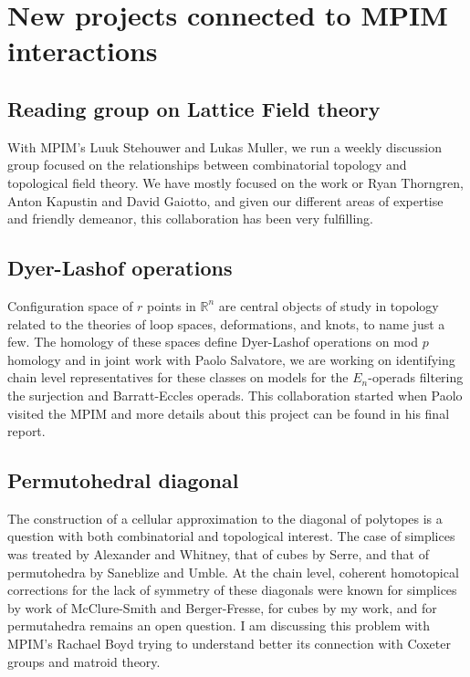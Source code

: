 \documentclass{amsart}
\theoremstyle{definition}
\begin{document}
	\section{New projects connected to MPIM interactions}
	
	\subsection{Reading group on Lattice Field theory}
	With MPIM's Luuk Stehouwer and Lukas Muller, we run a weekly discussion group focused on the relationships between combinatorial topology and topological field theory.
	We have mostly focused on the work or Ryan Thorngren, Anton Kapustin and David Gaiotto, and given our different areas of expertise and friendly demeanor, this collaboration has been very fulfilling.
	
	\subsection{Dyer-Lashof operations}
	Configuration space of $r$ points in $\mathbb R^n$ are central objects of study in topology related to the theories of loop spaces, deformations, and knots, to name just a few.
	The homology of these spaces define Dyer-Lashof operations on mod $p$ homology and in joint work with Paolo Salvatore, we are working on identifying chain level representatives for these classes on models for the $E_n$-operads filtering the surjection and Barratt-Eccles operads.
	This collaboration started when Paolo visited the MPIM and more details about this project can be found in his final report.
	
	\subsection{Permutohedral diagonal}
	The construction of a cellular approximation to the diagonal of polytopes is a question with both combinatorial and topological interest.
	The case of simplices was treated by Alexander and Whitney, that of cubes by Serre, and that of permutohedra by Saneblize and Umble.
	At the chain level, coherent homotopical corrections for the lack of symmetry of these diagonals were known for simplices by work of McClure-Smith and Berger-Fresse, for cubes by my work, and for permutahedra remains an open question.
	I am discussing this problem with MPIM's Rachael Boyd trying to understand better its connection with Coxeter groups and matroid theory.
	
\end{document}
